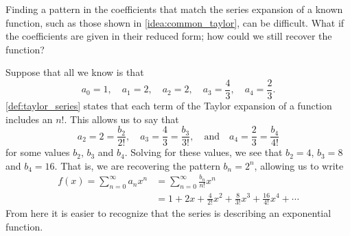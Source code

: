 
Finding a pattern in the coefficients that match the series expansion of a known function, such as those shown in \autoref{idea:common_taylor}, can be difficult. What if the coefficients %
are given in their reduced form; how could we still recover the function?%

Suppose that all we know is that 
$$a_0=1,\quad a_1=2,\quad a_2=2,\quad a_3=\frac43,\quad a_4=\frac23.$$
\autoref{def:taylor_series} states that each term of the Taylor expansion of a function includes an $n!$. This allows us to say that
$$a_2=2=\frac{b_2}{2!},\quad a_3 = \frac43=\frac{b_3}{3!},\quad \text{and}\quad a_4 = \frac23=\frac{b_4}{4!}$$
for some values $b_2$, $b_3$ and $b_4$.
Solving for these values, we see that $b_2=4$, $b_3 = 8$ and $b_4=16$. That is, we are recovering the pattern $b_n=2^n$, %
allowing us to write 
\begin{align*}
	f(x) = \sum_{n=0}^\infty a_nx^n
	&= \sum_{n=0}^\infty \frac{b_n}{n!}x^n \\
	&= 1+2x+ \frac{4}{2!}x^2 + \frac{8}{3!}x^3+\frac{16}{4!}x^4 + \dotsb
\end{align*}
From here it is easier to recognize that the series is describing an exponential function.


